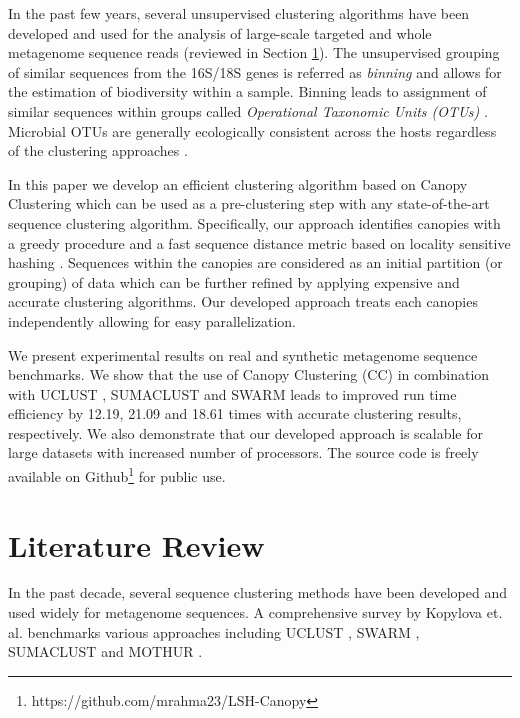 \documentclass[10pt, conference, compsocconf]{IEEEtran}
\begin{document}
In the past few years, several unsupervised 
clustering algorithms have been developed and
used for the analysis of large-scale targeted and whole 
metagenome sequence reads 
(reviewed in Section \ref{sec:Literature}). The 
unsupervised grouping  of similar sequences from the 
16S/18S genes is referred as \emph{binning} and 
allows for the estimation of biodiversity within a sample. Binning 
leads to assignment of similar sequences within groups called \emph{Operational Taxonomic Units (OTUs)} \cite{MAROTU}. Microbial OTUs are generally 
ecologically consistent across the hosts regardless of the 
clustering approaches \cite{MAROTUConsistant}. 


In this paper we develop an 
efficient clustering algorithm based on Canopy Clustering \cite{MARCanopy} which can be used as a pre-clustering  
step with any state-of-the-art sequence clustering algorithm. Specifically, 
our approach identifies canopies with a greedy procedure and a 
fast sequence distance metric based on locality 
sensitive hashing \cite{MARLshRef2}. Sequences within the canopies are 
considered as an initial partition (or grouping) of data which can be 
further refined by applying expensive and accurate clustering 
algorithms. Our developed approach treats each canopies independently 
allowing for easy parallelization.

We present experimental results on 
real and synthetic metagenome sequence
benchmarks. We show that the 
use of Canopy Clustering (CC) in combination 
with UCLUST \cite{MARuclust}, SUMACLUST \cite{MARSumaclust} and 
SWARM \cite{MARSwarm2} leads to improved run 
time efficiency by 12.19, 21.09 and 18.61 times with accurate clustering results, respectively. We also demonstrate that our 
developed approach is scalable for large datasets with 
increased number of processors. The 
source code is freely available on Github\footnote{https://github.com/mrahma23/LSH-Canopy} for public use. 

          

\section{Literature Review}
\label{sec:Literature}

In the past decade, several 
sequence clustering methods have been developed and
used widely for metagenome sequences. A comprehensive survey 
by Kopylova et. al. \cite{MARopenDeNovo} benchmarks 
various  approaches 
including UCLUST \cite{MARuclust}, SWARM \cite{MARSwarm2}, 
SUMACLUST \cite{MARSumaclust} and MOTHUR \cite{MARMothur}. 
\end{document}
